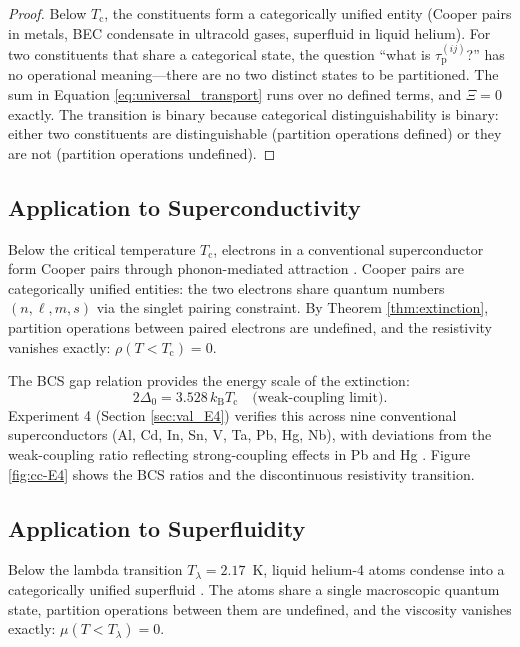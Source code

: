 \documentclass[twocolumn,10pt,a4paper]{article}
\theoremstyle{definition}
\theoremstyle{remark}
\newcommand{\kB}{k_{\mathrm{B}}}
\newcommand{\Tcrit}{T_{\mathrm{c}}}
\newcommand{\tauP}{\tau_{\mathrm{p}}}
\newcommand{\Transp}{\Xi}
\begin{document}
\begin{proof}
Below $\Tcrit$, the constituents form a categorically unified entity (Cooper pairs in metals, BEC condensate in ultracold gases, superfluid in liquid helium). For two constituents that share a categorical state, the question ``what is $\tauP^{(ij)}$?'' has no operational meaning---there are no two distinct states to be partitioned. The sum in Equation \eqref{eq:universal_transport} runs over no defined terms, and $\Transp = 0$ exactly. The transition is binary because categorical distinguishability is binary: either two constituents are distinguishable (partition operations defined) or they are not (partition operations undefined).
\end{proof}

\subsection{Application to Superconductivity}

Below the critical temperature $\Tcrit$, electrons in a conventional superconductor form Cooper pairs through phonon-mediated attraction \citep{bcs1957,onnes1911}. Cooper pairs are categorically unified entities: the two electrons share quantum numbers $(n, \ell, m, s)$ via the singlet pairing constraint. By Theorem \ref{thm:extinction}, partition operations between paired electrons are undefined, and the resistivity vanishes exactly: $\rho(T < \Tcrit) = 0$.

The BCS gap relation provides the energy scale of the extinction:
\begin{equation}
2\Delta_0 = 3.528\, \kB \Tcrit \quad \text{(weak-coupling limit)}.
\label{eq:bcs_gap}
\end{equation}
Experiment 4 (Section \ref{sec:val_E4}) verifies this across nine conventional superconductors (Al, Cd, In, Sn, V, Ta, Pb, Hg, Nb), with deviations from the weak-coupling ratio reflecting strong-coupling effects in Pb and Hg \citep{schrieffer1964,tinkham1996}. Figure \ref{fig:cc-E4} shows the BCS ratios and the discontinuous resistivity transition.

\subsection{Application to Superfluidity}

Below the lambda transition $T_\lambda = 2.17$~K, liquid helium-4 atoms condense into a categorically unified superfluid \citep{kapitza1938,allen1938,landau1941}. The atoms share a single macroscopic quantum state, partition operations between them are undefined, and the viscosity vanishes exactly: $\mu(T < T_\lambda) = 0$.
\end{document}
